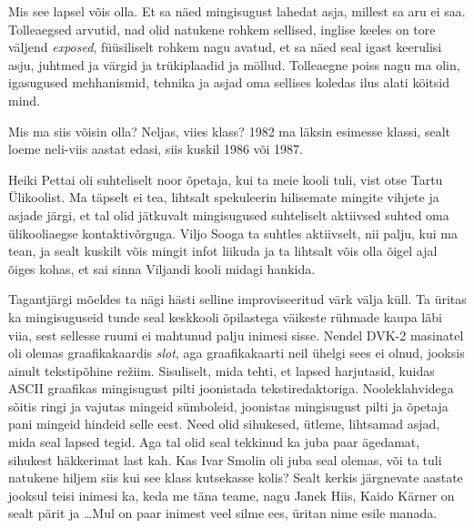 Mis see lapsel võis olla. Et sa näed mingisugust lahedat asja, millest sa aru 
ei saa. Tolleaegsed arvutid, nad olid natukene rohkem sellised, inglise keeles 
on tore väljend \emph{exposed}, füüsiliselt rohkem nagu avatud, et sa näed seal 
igast keerulisi asju, juhtmed ja värgid ja trükiplaadid ja möllud. Tolleaegne 
poiss nagu ma olin,  igasugused mehhanismid, tehnika ja asjad oma sellises 
koledas ilus alati köitsid mind. 


Mis ma siis võisin olla? Neljas, viies klass? 1982 ma läksin esimesse klassi, 
sealt loeme neli-viis aastat edasi, siis kuskil 1986 või 1987. 


Heiki Pettai oli suhteliselt noor õpetaja, kui ta 
meie kooli tuli, vist otse Tartu Ülikoolist. Ma täpselt ei tea, lihtsalt 
spekuleerin hilisemate mingite vihjete ja asjade järgi, et tal olid jätkuvalt 
mingisugused suhteliselt aktiivsed suhted  oma ülikooliaegse 
kontaktivõrguga. Viljo Sooga ta suhtles aktiivselt, nii 
palju, kui ma tean, ja sealt kuskilt võis mingit infot liikuda ja ta lihtsalt 
võis olla õigel ajal õiges kohas, et sai sinna Viljandi kooli  midagi hankida. 


Tagantjärgi mõeldes ta nägi hästi selline improviseeritud värk välja küll. 
Ta  üritas ka mingisuguseid tunde seal  keskkooli õpilastega väikeste rühmade 
kaupa läbi viia, sest sellesse ruumi ei mahtunud 
palju  inimesi sisse. Nendel DVK-2 masinatel oli olemas graafikakaardis \emph{slot}, 
aga  graafikakaarti neil ühelgi sees ei olnud,  jooksis ainult 
tekstipõhine režiim. Sisuliselt, mida tehti, et  lapsed harjutasid, kuidas 
ASCII graafikas mingisugust pilti joonistada tekstiredaktoriga. Nooleklahvidega 
sõitis ringi ja vajutas mingeid sümboleid, joonistas mingisugust pilti  
ja õpetaja pani mingeid hindeid selle eest. Need olid sihukesed, ütleme, 
lihtsamad asjad, mida seal lapsed tegid. Aga tal olid seal tekkinud ka juba 
paar ägedamat, sihukest häkkerimat last kah. Kas Ivar Smolin oli juba seal olemas, või ta tuli natukene hiljem siis kui see klass 
kutsekasse kolis? Sealt kerkis  järgnevate aastate jooksul teisi inimesi ka, 
keda me täna teame, nagu Janek Hiis, Kaido 
Kärner on sealt pärit ja \ldots Mul on paar inimest 
veel silme ees, üritan nime esile manada.

